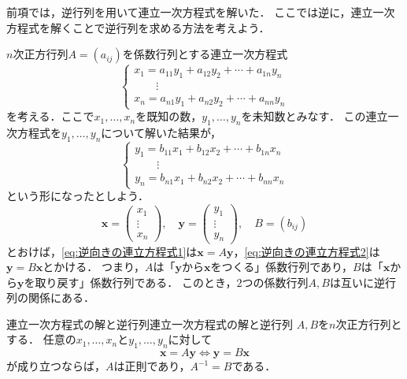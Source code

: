 前項では，逆行列を用いて連立一次方程式を解いた．
ここでは逆に，連立一次方程式を解くことで逆行列を求める方法を考えよう．

$n$次正方行列$A = (a_{ij})$を係数行列とする連立一次方程式
\begin{equation}
  \begin{cases}
    x_1 = a_{11}y_1 + a_{12}y_2 + \cdots + a_{1n}y_n \\
    \hspace{2em} \vdots \\
    x_n = a_{n1}y_1 + a_{n2}y_2 + \cdots + a_{nn}y_n
  \end{cases} \label{eq:逆向きの連立方程式1}
\end{equation}
を考える．ここで$x_1, \dots, x_n$を既知の数，$y_1, \dots, y_n$を未知数とみなす．
この連立一次方程式を$y_1, \dots, y_n$について解いた結果が，
\begin{equation}
  \begin{cases}
    y_1 = b_{11}x_1 + b_{12}x_2 + \cdots + b_{1n}x_n \\
    \hspace{2em} \vdots \\
    y_n = b_{n1}x_1 + b_{n2}x_2 + \cdots + b_{nn}x_n
  \end{cases} \label{eq:逆向きの連立方程式2}
\end{equation}
という形になったとしよう．
\[
  \bm{x} = \begin{pmatrix} x_1 \\ \vdots \\ x_n \end{pmatrix}, \quad
  \bm{y} = \begin{pmatrix} y_1 \\ \vdots \\ y_n \end{pmatrix}, \quad
  B = (b_{ij})
\]
とおけば，\eqref{eq:逆向きの連立方程式1}は$\bm{x} = A\bm{y}$，\eqref{eq:逆向きの連立方程式2}は$\bm{y} = B\bm{x}$とかける．
つまり，$A$は「$\bm{y}$から$\bm{x}$をつくる」係数行列であり，$B$は「$\bm{x}$から$\bm{y}$を取り戻す」係数行列である．
このとき，$2$つの係数行列$A,B$は互いに逆行列の関係にある．

\begin{prop}{連立一次方程式の解と逆行列}{連立一次方程式の解と逆行列}
  $A,B$を$n$次正方行列とする．
  任意の$x_1, \dots, x_n$と$y_1, \dots, y_n$に対して
  \[
    \bm{x} = A\bm{y} \iff \bm{y} = B\bm{x}
  \]
  が成り立つならば，$A$は正則であり，$A^{-1} = B$である．
\end{prop}

